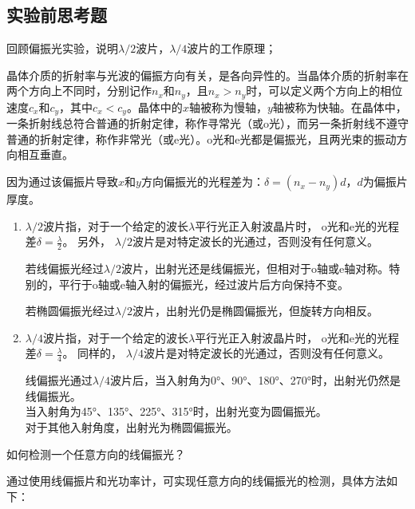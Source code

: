\documentclass[dvipsnames, svgnames,a4paper,11pt]{article}
\begin{document}
\subsection{实验前思考题}

\begin{question}
	回顾偏振光实验，说明$\lambda / 2$波片，$\lambda / 4$波片的工作原理；
\end{question}


	晶体介质的折射率与光波的偏振方向有关，是各向异性的。当晶体介质的折射率在两个方向上不同时，分别记作$n_x$和$n_y$，且$n_x>n_y$时，可以定义两个方向上的相位速度$c_x$和$c_y$，其中$c_x<c_y$。晶体中的$x$轴被称为慢轴，$y$轴被称为快轴。在晶体中，一条折射线总符合普通的折射定律，称作寻常光（或o光），而另一条折射线不遵守普通的折射定律，称作非常光（或e光）。o光和e光都是偏振光，且两光束的振动方向相互垂直。

	因为通过该偏振片导致$x$和$y$方向偏振光的光程差为：$\delta=(n_x-n_y)d$，$d$为偏振片厚度。

	\begin{enumerate}
		\item $\lambda/ 2$波片指，对于一个给定的波长$\lambda$平行光正入射波晶片时， o光和e光的光程差$\delta=\frac{\lambda}{2}$。
		另外， $\lambda/ 2$波片是对特定波长的光通过，否则没有任何意义。
		
		若线偏振光经过$\lambda/ 2$波片，出射光还是线偏振光，但相对于o轴或e轴对称。特别的，平行于o轴或e轴入射的偏振光，经过波片后方向保持不变。
		
		若椭圆偏振光经过$\lambda/ 2$波片，出射光仍是椭圆偏振光，但旋转方向相反。

		\item $\lambda/ 4$波片指，对于一个给定的波长$\lambda$平行光正入射波晶片时， o光和e光的光程差$\delta=\frac{\lambda}{4}$。
		同样的， $\lambda/ 4$波片是对特定波长的光通过，否则没有任何意义。

		线偏振光通过$\lambda/ 4$波片后，当入射角为0°、90°、180°、270°时，出射光仍然是线偏振光。\\
		当入射角为45°、135°、225°、315°时，出射光变为圆偏振光。\\
		对于其他入射角度，出射光为椭圆偏振光。


	\end{enumerate}


\begin{question}
	如何检测一个任意方向的线偏振光？
\end{question}

	通过使用线偏振片和光功率计，可实现任意方向的线偏振光的检测，具体方法如下：
\end{document}
